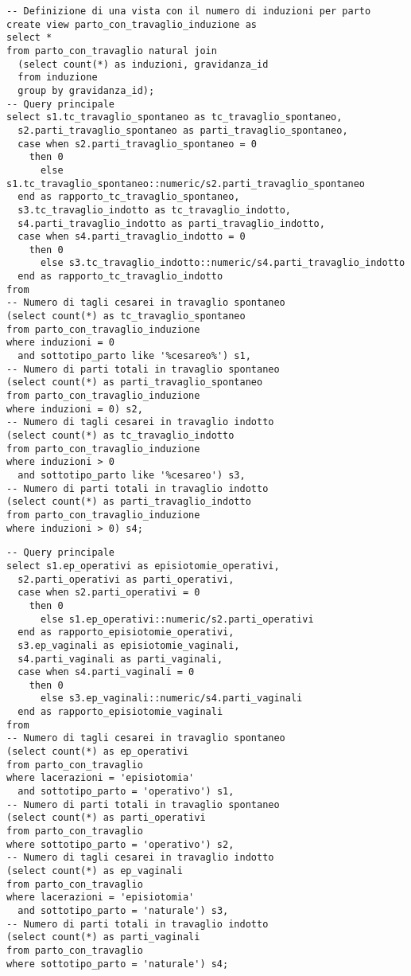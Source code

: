 \begin{lstlisting}[float,caption={Esempio di \emph{query}. Correlazione tra parto cesareo e travaglio indotto.},label=qcesareotravaglio]
-- Definizione di una vista con il numero di induzioni per parto
create view parto_con_travaglio_induzione as
select *
from parto_con_travaglio natural join
  (select count(*) as induzioni, gravidanza_id
  from induzione
  group by gravidanza_id);
-- Query principale
select s1.tc_travaglio_spontaneo as tc_travaglio_spontaneo,
  s2.parti_travaglio_spontaneo as parti_travaglio_spontaneo,
  case when s2.parti_travaglio_spontaneo = 0
    then 0
	  else s1.tc_travaglio_spontaneo::numeric/s2.parti_travaglio_spontaneo
  end as rapporto_tc_travaglio_spontaneo,
  s3.tc_travaglio_indotto as tc_travaglio_indotto,
  s4.parti_travaglio_indotto as parti_travaglio_indotto,
  case when s4.parti_travaglio_indotto = 0
    then 0
	  else s3.tc_travaglio_indotto::numeric/s4.parti_travaglio_indotto
  end as rapporto_tc_travaglio_indotto
from
-- Numero di tagli cesarei in travaglio spontaneo
(select count(*) as tc_travaglio_spontaneo
from parto_con_travaglio_induzione
where induzioni = 0
  and sottotipo_parto like '%cesareo%') s1,
-- Numero di parti totali in travaglio spontaneo
(select count(*) as parti_travaglio_spontaneo
from parto_con_travaglio_induzione
where induzioni = 0) s2,
-- Numero di tagli cesarei in travaglio indotto
(select count(*) as tc_travaglio_indotto
from parto_con_travaglio_induzione
where induzioni > 0
  and sottotipo_parto like '%cesareo') s3,
-- Numero di parti totali in travaglio indotto
(select count(*) as parti_travaglio_indotto
from parto_con_travaglio_induzione
where induzioni > 0) s4;
\end{lstlisting}

\begin{lstlisting}[float,caption={Esempio di \emph{query}. Correlazione tra parto operativo ed episiotomia.},label=qoperativoepisiotomia]
-- Query principale
select s1.ep_operativi as episiotomie_operativi,
  s2.parti_operativi as parti_operativi,
  case when s2.parti_operativi = 0
    then 0
	  else s1.ep_operativi::numeric/s2.parti_operativi
  end as rapporto_episiotomie_operativi,
  s3.ep_vaginali as episiotomie_vaginali,
  s4.parti_vaginali as parti_vaginali,
  case when s4.parti_vaginali = 0
    then 0
	  else s3.ep_vaginali::numeric/s4.parti_vaginali
  end as rapporto_episiotomie_vaginali
from
-- Numero di tagli cesarei in travaglio spontaneo
(select count(*) as ep_operativi
from parto_con_travaglio
where lacerazioni = 'episiotomia'
  and sottotipo_parto = 'operativo') s1,
-- Numero di parti totali in travaglio spontaneo
(select count(*) as parti_operativi
from parto_con_travaglio
where sottotipo_parto = 'operativo') s2,
-- Numero di tagli cesarei in travaglio indotto
(select count(*) as ep_vaginali
from parto_con_travaglio
where lacerazioni = 'episiotomia'
  and sottotipo_parto = 'naturale') s3,
-- Numero di parti totali in travaglio indotto
(select count(*) as parti_vaginali
from parto_con_travaglio
where sottotipo_parto = 'naturale') s4;
\end{lstlisting}

